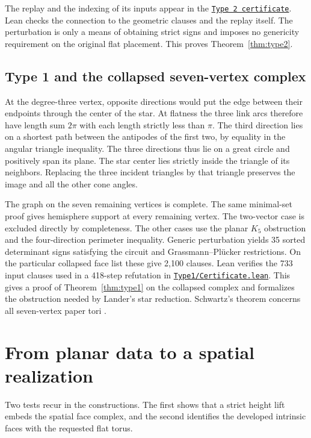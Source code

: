 \documentclass[11pt,letterpaper]{amsart}
\newcommand{\release}{bd3a0e03908481d738df30233cf95c641a1d3f71}
\newcommand{\src}[2]{\href{https://github.com/vltanh/lean4-origami-torus/blob/\release/#1}{\texttt{#2}}}
\begin{document}
The replay and the indexing of its inputs appear in the
\src{OrigamiTorus/EightVertex/Type2/Certificate.lean}{Type 2 certificate}.
Lean checks the connection to the geometric clauses and the replay
itself. The perturbation is only a means of obtaining strict signs
and imposes no genericity requirement on the original flat
placement. This proves Theorem~\ref{thm:type2}.

\subsection*{Type 1 and the collapsed seven-vertex complex}

At the degree-three vertex, opposite directions would put the edge
between their endpoints through the center of the star. At flatness
the three link arcs therefore have length sum \(2\pi\) with each
length strictly less than \(\pi\). The third direction lies on a
shortest path between the antipodes of the first two, by equality
in the angular triangle inequality. The three directions thus lie
on a great circle and positively span its plane. The star center
lies strictly inside the triangle of its neighbors. Replacing the
three incident triangles by that triangle preserves the image and
all the other cone angles.

The graph on the seven remaining vertices is complete. The same
minimal-set proof gives hemisphere support at every remaining
vertex. The two-vector case is excluded directly by completeness.
The other cases use the planar \(K_5\) obstruction and the
four-direction perimeter inequality. Generic perturbation yields
35 sorted determinant signs satisfying the circuit and
Grassmann--Pl\"ucker restrictions. On the particular collapsed
face list these give 2,100 clauses. Lean verifies the 733 input
clauses used in a 418-step refutation in
\src{OrigamiTorus/EightVertex/Type1/Certificate.lean}{Type1/Certificate.lean}.
This gives a proof of Theorem~\ref{thm:type1} on the collapsed complex
and formalizes the obstruction needed by Lander's star reduction.
Schwartz's theorem concerns all seven-vertex paper tori
\cite{schwartz}.

\section{From planar data to a spatial realization}\label{sec:method}

Two tests recur in the constructions. The first shows that a strict
height lift embeds the spatial face complex, and the second
identifies the developed intrinsic faces with the requested flat
torus.
\end{document}
